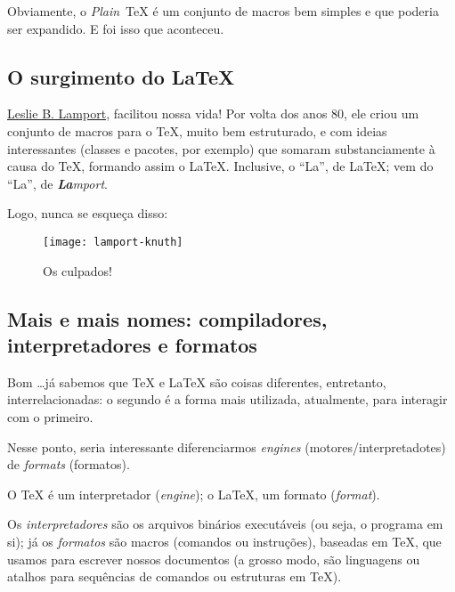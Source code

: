Obviamente, o \textit{Plain}~\TeX{} é um conjunto de macros bem simples e que 
poderia ser expandido.
E foi isso que aconteceu.

\subsection{O surgimento do \LaTeX} %

\href{https://pt.wikipedia.org/wiki/Leslie_Lamport}{Leslie B. Lamport}, facilitou 
nossa vida! 
Por volta dos anos 80, ele criou um conjunto de macros para o \TeX, muito bem 
estruturado, e com ideias interessantes (classes e pacotes, por exemplo) que 
somaram substanciamente à causa do \TeX{}, formando assim o \LaTeX.
Inclusive, o ``La'', de \LaTeX{}; vem do ``La'', de \textit{\textbf{La}mport}.

Logo, nunca se esqueça disso:


\begin{figure}[!ht]
  \centering
  \texttt{[image: lamport-knuth]}
  \caption{Os culpados!}
\end{figure}

\subsection{Mais e mais nomes: compiladores, interpretadores e formatos} %

Bom \ldots já sabemos que  \TeX{} e \LaTeX{} são coisas diferentes, entretanto,
interrelacionadas: o segundo é a forma mais utilizada, atualmente, para 
interagir com o primeiro.

Nesse ponto, seria interessante diferenciarmos \textit{engines} (motores/interpretadotes) 
de \textit{formats} (formatos).

O \TeX{} é um interpretador (\textit{engine}); o \LaTeX, um formato (\textit{format}).


Os \textit{interpretadores} são os arquivos binários executáveis (ou seja, o 
programa em si); já os \textit{formatos} são macros (comandos ou instruções), 
baseadas em \TeX, que usamos para escrever nossos documentos (a grosso modo, são
linguagens ou atalhos para sequências de comandos ou estruturas em \TeX).

